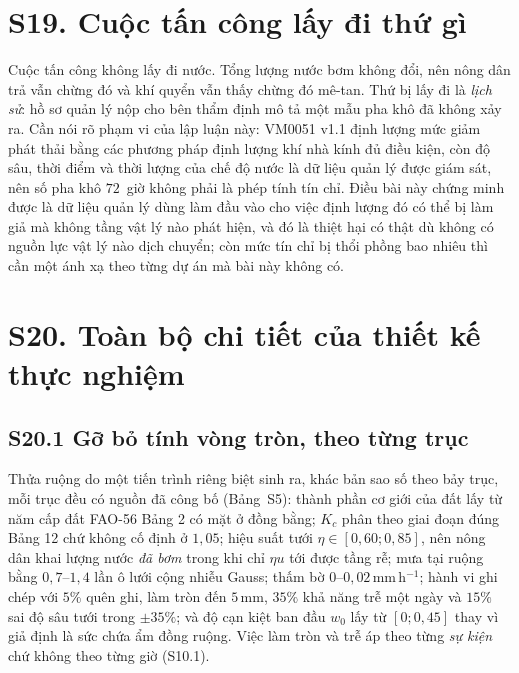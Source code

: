 \section*{S19. Cuộc tấn công lấy đi thứ gì}

Cuộc tấn công không lấy đi nước. Tổng lượng nước bơm không đổi, nên nông dân trả vẫn chừng
đó và khí quyển vẫn thấy chừng đó mê-tan. Thứ bị lấy đi là \emph{lịch sử}: hồ sơ quản lý nộp cho bên thẩm định mô tả một mẫu pha khô đã không xảy ra. Cần nói rõ phạm vi của lập luận này: VM0051 v1.1 định lượng mức giảm phát thải bằng các phương pháp định lượng khí nhà kính đủ điều kiện, còn độ sâu, thời điểm và thời lượng của chế độ nước là dữ liệu quản lý được giám sát, nên số pha khô $72$~giờ không phải là phép tính tín chỉ. Điều bài này chứng minh được là dữ liệu quản lý dùng làm đầu vào cho việc định lượng đó có thể bị làm giả mà không tầng vật lý nào phát hiện, và đó là thiệt hại có thật dù không có nguồn lực vật lý nào dịch chuyển; còn mức tín chỉ bị thổi phồng bao nhiêu thì cần một ánh xạ theo từng dự án mà bài này không có.

\section*{S20. Toàn bộ chi tiết của thiết kế thực nghiệm}

\subsection*{S20.1 Gỡ bỏ tính vòng tròn, theo từng trục}

Thửa ruộng do một tiến trình riêng biệt sinh ra, khác bản sao số theo bảy trục, mỗi trục đều có
nguồn đã công bố (Bảng~S5): thành phần cơ giới của đất lấy từ năm cấp đất FAO-56 Bảng 2 có mặt ở
đồng bằng; $K_c$ phân theo giai đoạn đúng Bảng 12 chứ không cố định ở $1{,}05$; hiệu suất tưới
$\eta\in[0{,}60;0{,}85]$, nên nông dân khai lượng nước \emph{đã bơm} trong khi chỉ $\eta u$ tới
được tầng rễ; mưa tại ruộng bằng $0{,}7$--$1{,}4$ lần ô lưới cộng nhiễu Gauss; thấm bờ
$0$--$0{,}02$\,mm\,h$^{-1}$; hành vi ghi chép với $5\%$ quên ghi, làm tròn đến $5$\,mm, $35\%$
khả năng trễ một ngày và $15\%$ sai độ sâu tưới trong $\pm35\%$; và độ cạn kiệt ban đầu $w_0$ lấy từ
$[0;0{,}45]$ thay vì giả định là sức chứa ẩm đồng ruộng. Việc làm tròn và trễ áp theo từng
\emph{sự kiện} chứ không theo từng giờ (S10.1).

